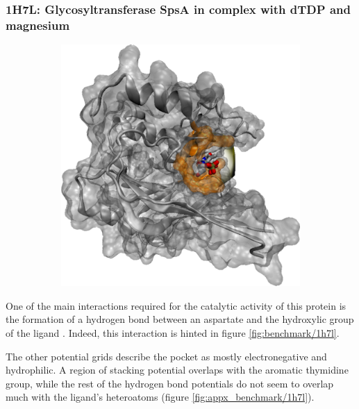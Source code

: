     \subsubsection{1H7L: Glycosyltransferase SpsA in complex with dTDP and magnesium}
      \begin{figure}[H] \centering
        \begin{subfigure}[c]{0.3\textwidth} \centering
          \includegraphics[width=1\textwidth]{figures/results/ps_prot/1h7l.png}
        \end{subfigure}
        \begin{subfigure}[c]{0.3\textwidth} \centering
        \end{subfigure}
      \end{figure}

      One of the main interactions required for the catalytic activity of this protein is the formation of a hydrogen bond between an aspartate and the hydroxylic group of the ligand \cite{benchmark_1h7l_2001}. Indeed, this interaction is hinted in figure \ref{fig:benchmark/1h7l}.

      The other potential grids describe the pocket as mostly electronegative and hydrophilic. A region of stacking potential overlaps with the aromatic thymidine group, while the rest of the hydrogen bond potentials do not seem to overlap much with the ligand's heteroatoms (figure \ref{fig:appx_benchmark/1h7l}).

